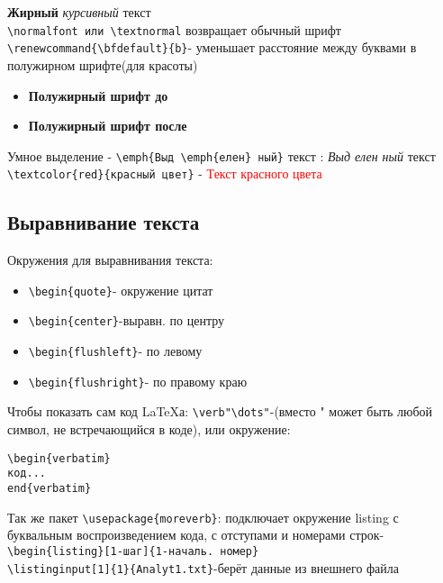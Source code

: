 \documentclass[a4paper,12pt]{article}%
\theoremstyle{plain}%
\theoremstyle{definition}%
\theoremstyle{remark}%
\begin{document}
\noindent\textbf{Жирный} \textit{курсивный} текст \\
\verb|\normalfont или \textnormal| возвращает обычный шрифт \\
\verb|\renewcommand{\bfdefault}{b}|- уменьшает расстояние между буквами в полужирном шрифте(для красоты) \\
\begin{itemize}
\item[] \textbf{Полужирный шрифт до}
\renewcommand{\bfdefault}{b}
\item[] \textbf{Полужирный шрифт после}
\end{itemize}
Умное выделение - \verb|\emph{Выд \emph{елен} ный}| текст :
\emph{Выд \emph{елен} ный} текст \\
\verb|\textcolor{red}{красный цвет}| - \textcolor{red}{Текст красного цвета}



\subsection{Выравнивание текста}

Окружения для выравнивания текста:
\begin{itemize}
\item \verb|\begin{quote}|- окружение цитат
\item \verb|\begin{center}|-выравн. по центру
\item \verb|\begin{flushleft}|- по левому
\item \verb|\begin{flushright}|- по правому краю
\end{itemize}

\noindent Чтобы показать сам код \LaTeX а:
\verb|\verb"\dots"|-(вместо " может быть любой символ, не встречающийся в коде), или окружение:
\begin{verbatim}
\begin{verbatim}
код...
end{verbatim}
\end{verbatim}

Так же пакет \verb|\usepackage{moreverb}|: подключает окружение listing с буквальным воспроизведением кода, с отступами и номерами строк- \\
\verb|\begin{listing}[1-шаг]{1-началь. номер}| \\
\verb|\listinginput[1]{1}{Analyt1.txt}|-берёт данные из внешнего файла
\end{document}
